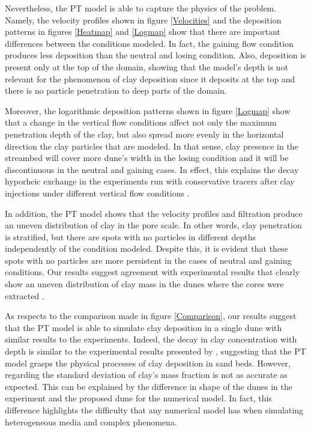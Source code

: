 \documentclass[draft,linenumbers]{agujournal2018}
\begin{document}
Nevertheless, the PT model is able to capture the physics of the problem. Namely, the velocity profiles shown in figure \ref{Velocities} and the deposition patterns in figures \ref{Heatmap} and \ref{Logmap} show that there are important differences between the conditions modeled. In fact, the gaining flow condition produces less deposition than the neutral and losing condition. Also, deposition is present only at the top of the domain, showing that the model's depth is not relevant for the phenomenon of clay deposition since it deposits at the top and there is no particle penetration to deep parts of the domain. 

Moreover, the logarithmic deposition patterns shown in figure \ref{Logmap} show that a change in the vertical flow conditions affect not only the maximum penetration depth of the clay, but also spread more evenly in the horizontal direction the clay particles that are modeled. In that sense, clay presence in the streambed will cover more dune's width in the losing condition and it will be discontinuous in the neutral and gaining cases. In effect, this explains the decay hyporheic exchange in the experiments run with conservative tracers after clay injections under different vertical flow conditions \citep{Fox2014,Fox2018}.

In addition, the PT model shows that the velocity profiles and filtration produce an uneven distribution of clay in the pore scale. In other words, clay penetration is stratified, but there are spots with no particles in different depths independently of the condition modeled. Despite this, it is evident that these spots with no particles are more persistent in the cases of neutral and gaining conditions. Our results suggest agreement with experimental results that clearly show an uneven distribution of clay mass in the dunes where the cores were extracted \citep{Fox2018}.

As respects to the comparison made in figure \ref{Comparison}, our results suggest that the PT model is able to simulate clay deposition in a single dune with similar results to the experiments. Indeed, the decay in clay concentration with depth is similar to the experimental results presented by \citet{Fox2018}, suggesting that the PT model grasps the physical processes of clay deposition in sand beds. However, regarding the standard deviation of clay's mass fraction is not as accurate as expected. This can be explained by the difference in shape of the dunes in the experiment and the proposed dune for the numerical model. In fact, this difference highlights the difficulty that any numerical model has when simulating heterogeneous media and complex phenomena.  
\end{document}
